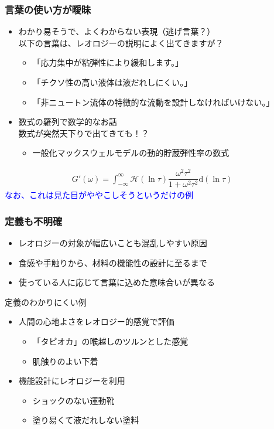 \documentclass[12pt, dvipdfmx]{beamer}
\begin{document}
\begin{frame}
	\frametitle{言葉の使い方が曖昧}
	\begin{itemize}
		\item わかり易そうで、よくわからない表現（逃げ言葉？）\\
		以下の言葉は、レオロジーの説明によく出てきますが？
		\begin{itemize}
			\item 「応力集中が粘弾性により緩和します。」
			\item 「チクソ性の高い液体は液だれしにくい。」
			\item 「非ニュートン流体の特徴的な流動を設計しなければいけない。」
		\end{itemize}
		\item 数式の羅列で数学的なお話\\
		数式が突然天下りで出てきても！？\\
		\begin{itemize}
			\item 一般化マックスウェルモデルの動的貯蔵弾性率の数式
		\end{itemize}
	\end{itemize}
	\vspace{-4mm}
	\begin{align*}
		\displaystyle G'(\omega) = \int_{-\infty}^{\infty} \mathcal{H}(\ln \tau)\dfrac{\omega^2 \tau^2}{1 + \omega^2 \tau^2} \mathrm{d}(\ln \tau)
	\end{align*}
	\textcolor{blue}{なお、これは見た目がややこしそうというだけの例}
\end{frame}

\begin{frame}
	\frametitle{定義も不明確}
	\begin{itemize}
		\item レオロジーの対象が幅広いことも混乱しやすい原因
		\item 食感や手触りから、材料の機能性の設計に至るまで
		\item 使っている人に応じて言葉に込めた意味合いが異なる
	\end{itemize}
	\begin{exampleblock}{定義のわかりにくい例}
		\begin{itemize}
			\item 人間の心地よさをレオロジー的感覚で評価
			\begin{itemize}
				\item 「タピオカ」の喉越しのツルンとした感覚
				\item 肌触りのよい下着
			\end{itemize}
			\item 機能設計にレオロジーを利用
			\begin{itemize}
				\item ショックのない運動靴
				\item 塗り易くて液だれしない塗料
			\end{itemize}
		\end{itemize}
	\end{exampleblock}
\end{frame}
\end{document}
